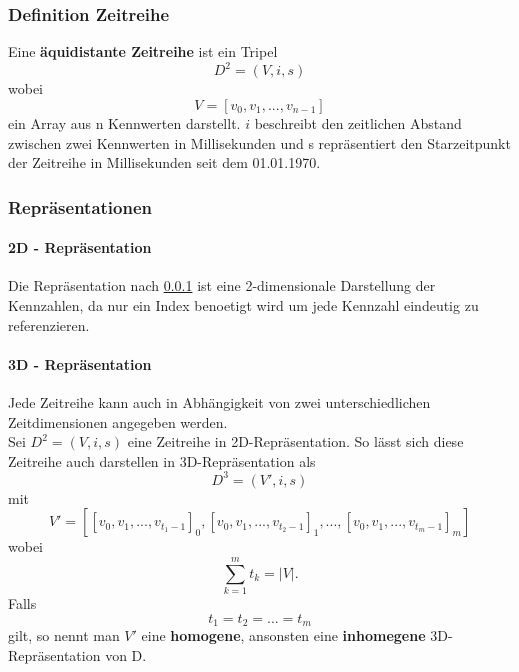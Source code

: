 \documentclass[12pt]{article}
\begin{document}
		\subsubsection{Definition Zeitreihe}
		\label{sec: def}
		Eine \textbf{äquidistante Zeitreihe} ist ein Tripel 
			\begin{equation}
				D^{2} = (V, i, s)
			\end{equation}
		wobei
			\begin{equation}
				V = [v_{0}, v_{1}, ..., v_{n - 1}]
			\end{equation}
		ein Array aus n Kennwerten darstellt.
		$i$ beschreibt den zeitlichen Abstand zwischen zwei Kennwerten in Millisekunden und s repräsentiert den Starzeitpunkt der Zeitreihe in 		Millisekunden seit dem 01.01.1970.
		\subsubsection{Repräsentationen}
			\paragraph{2D - Repräsentation}
				Die Repräsentation nach \ref{sec: def} ist eine 2-dimensionale Darstellung der Kennzahlen, da nur ein Index benoetigt wird um jede Kennzahl 						eindeutig zu referenzieren.
				
			\paragraph{3D - Repräsentation}
				Jede Zeitreihe kann auch in Abhängigkeit von zwei unterschiedlichen Zeitdimensionen angegeben werden. \\[0,3cm]
				Sei $D^{2} = (V, i, s)$ eine Zeitreihe in 2D-Repräsentation. So lässt sich diese Zeitreihe auch darstellen in 3D-Repräsentation als
				\begin{equation}
					D^{3} = (V', i, s)
				\end{equation}
				mit
				\begin{equation}
					V' = [[v_{0}, v_{1}, ..., v_{t_{1} - 1}]_{0},[v_{0}, v_{1}, ..., v_{t_{2} - 1}]_{1},...,[v_{0}, v_{1}, ..., v_{t_{m} - 1}]_{m}]
				\end{equation}
				wobei 
				\begin{equation}
					\sum_{k=1}^{m}t_{k} = |V|.
				\end{equation}
				Falls
				\begin{equation}
					t_{1}=t_{2}=...=t_{m}
				\end{equation}
				gilt, so nennt man $V'$ eine \textbf{homogene}, ansonsten eine \textbf{inhomegene} 3D-Repräsentation von D.
\end{document}
